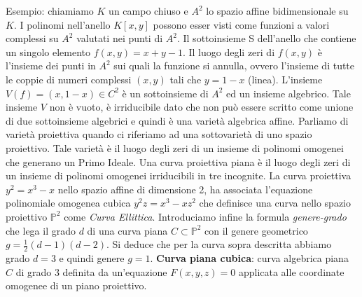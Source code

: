 \documentclass[a4paper,12pt]{tesiinfo}
\begin{document}
\newline
Esempio: chiamiamo $K$ un campo chiuso e $A^2$ lo spazio affine bidimensionale su $K$. I polinomi nell'anello $K[x, y]$ possono esser visti come funzioni a valori complessi su $A^2$ valutati nei punti di $A^2$. Il sottoinsieme S dell'anello che contiene un singolo elemento $f(x, y) = x + y - 1$. Il luogo degli zeri di $f(x, y)$ \`e l'insieme dei punti in $A^2$ sui quali la funzione si annulla, ovvero l'insieme di tutte le coppie di numeri complessi $(x, y)$ tali che $y = 1 - x$ (linea). L'insieme $V(f) = {(x, 1-x) \in C^2}$ \`e un sottoinsieme di $A^2$ ed un insieme algebrico. Tale insieme $V$ non \`e vuoto, \`e irriducibile dato che non pu\`o essere scritto come unione di due sottoinsieme algebrici e quindi \`e una variet\`a algebrica affine.
%
%
%
\newline\newline
Parliamo di variet\`a proiettiva quando ci riferiamo ad una sottovariet\`a di uno spazio proiettivo. Tale variet\`a \`e il luogo degli zeri di un insieme di polinomi omogenei che generano un Primo Ideale.
\newline
Una curva proiettiva piana \`e il luogo degli zeri di un insieme di polinomi omogenei irriducibili in tre incognite. La curva proiettiva $y^2 = x^3 -x$ nello spazio affine di dimensione 2, ha associata l'equazione polinomiale omogenea cubica $y^2z = x^3 - xz^2$ che definisce una curva nello spazio proiettivo $\mathbb{P}^2$ come \textit{Curva Ellittica}. 
\newline
Introduciamo infine la formula \textit{genere-grado} che lega il grado $d$ di una curva piana $C \subset \mathbb{P}^2$ con il genere geometrico $g = \frac{1}{2} (d-1)(d-2)$.
\newline
Si deduce che per la curva sopra descritta abbiamo grado $d = 3$ e quindi genere $g = 1$.
\newline\newline
%
%
%
\textbf{Curva piana cubica}: curva algebrica piana $C$ di grado 3 definita da un'equazione $F(x, y, z) = 0$ applicata alle coordinate omogenee di un piano proiettivo. 
\end{document}
